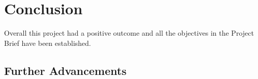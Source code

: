 \chapter{Conclusion}

\label{ch:planwork}
\setlength\lineskip{0pt}
\vspace*{15pt}

Overall this project had a positive outcome and all the objectives in the Project Brief have been established.

\section{Further Advancements}